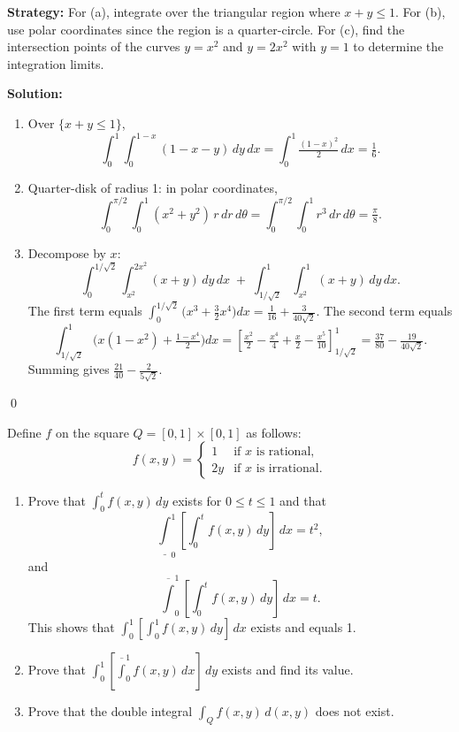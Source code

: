 \noindent\textbf{Strategy:} For (a), integrate over the triangular region where $x+y\leq 1$. For (b), use polar coordinates since the region is a quarter-circle. For (c), find the intersection points of the curves $y=x^2$ and $y=2x^2$ with $y=1$ to determine the integration limits.

\bigskip\noindent\textbf{Solution:}
\begin{enumerate}[label=(\alph*)]
    \item Over $\{x+y\le 1\}$,
    \[ \int_0^1 \!\int_0^{1-x} (1-x-y)\,dy\,dx = \int_0^1 \tfrac{(1-x)^2}{2}\,dx = \tfrac{1}{6}. \]
    \item Quarter-disk of radius 1: in polar coordinates,
    \[ \int_0^{\pi/2}\!\int_0^1 (x^2+y^2)\,r\,dr\,d\theta = \int_0^{\pi/2}\!\int_0^1 r^3\,dr\,d\theta = \tfrac{\pi}{8}. \]
    \item Decompose by $x$:
    \[ \int_0^{1/\sqrt{2}} \!\int_{x^2}^{2x^2} (x+y)\,dy\,dx\; +\; \int_{1/\sqrt{2}}^{1} \!\int_{x^2}^{1} (x+y)\,dy\,dx. \]
    The first term equals $\int_0^{1/\sqrt{2}} \big(x^3+\tfrac{3}{2}x^4\big)dx= \tfrac{1}{16}+\tfrac{3}{40\sqrt{2}}$. The second term equals
    \[ \int_{1/\sqrt{2}}^{1} \Big(x(1-x^2)+\tfrac{1-x^4}{2}\Big)dx = \left[\tfrac{x^2}{2}-\tfrac{x^4}{4}+\tfrac{x}{2}-\tfrac{x^5}{10}\right]_{1/\sqrt{2}}^{1} = \tfrac{37}{80}-\tfrac{19}{40\sqrt{2}}. \]
    Summing gives $\tfrac{21}{40}-\tfrac{2}{5\sqrt{2}}$.
\end{enumerate}\qed


\begin{problembox}
Define \( f \) on the square \( Q = [0, 1] \times [0, 1] \) as follows:
\[ f(x, y) = 
\begin{cases} 
1 & \text{if } x \text{ is rational}, \\
2y & \text{if } x \text{ is irrational}. 
\end{cases} \]
\begin{enumerate}[label=(\alph*)]
    \item Prove that \( \int_{0}^{t} f(x, y) \, dy \) exists for \( 0 \leq t \leq 1 \) and that
    \[ \underline\int_{0}^{1} \left[ \int_{0}^{t} f(x, y) \, dy \right] \, dx = t^2, \]
    and \[ \overline\int_{0}^{1} \left[ \int_{0}^{t} f(x, y) \, dy \right] \, dx = t. \]
    This shows that \( \int_{0}^{1} \left[ \int_{0}^{1} f(x, y) \, dy \right] \, dx \) exists and equals 1.
    
    \item Prove that \( \int_{0}^{1} \left[ \overline\int_{0}^{1} f(x, y) \, dx \right] \, dy \) exists and find its value.
    \item Prove that the double integral \( \int_{Q} f(x, y) \, d(x, y) \) does not exist.
\end{enumerate}
\end{problembox}

